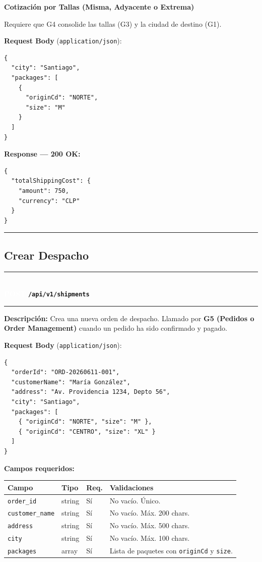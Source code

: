 \documentclass[11pt, a4paper]{article}
\newcommand{\httpmethod}[2]{%
  \colorbox{#1}{\textcolor{white}{\textbf{\small\textsf{#2}}}}%
}
\newcommand{\routeheader}[3]{%
  \noindent\rule{\textwidth}{1.5pt}\\[0.3em]
  \httpmethod{#1}{#2}\;\texttt{\bfseries #3}\\[0.3em]
  \rule{\textwidth}{0.4pt}
  \vspace{0.3cm}
}
\begin{document}
\vspace{0.3cm}
\textbf{Cotización por Tallas (Misma, Adyacente o Extrema)}

Requiere que G4 consolide las tallas (G3) y la ciudad de destino (G1).

\textbf{Request Body} (\texttt{application/json}):
\begin{lstlisting}
{
  "city": "Santiago",
  "packages": [
    {
      "originCd": "NORTE",
      "size": "M"
    }
  ]
}
\end{lstlisting}

\vspace{0.3cm}
\textbf{Response --- 200 OK:}

\begin{lstlisting}
{
  "totalShippingCost": {
    "amount": 750,
    "currency": "CLP"
  }
}
\end{lstlisting}

\noindent\rule{\textwidth}{0.4pt}

\subsection{Crear Despacho}

\routeheader{post}{POST}{/api/v1/shipments}

\textbf{Descripción:} Crea una nueva orden de despacho. Llamado por
\textbf{G5 (Pedidos o Order Management)} cuando un pedido ha sido confirmado y pagado.

\vspace{0.3cm}
\textbf{Request Body} (\texttt{application/json}):

\begin{lstlisting}
{
  "orderId": "ORD-20260611-001",
  "customerName": "María González",
  "address": "Av. Providencia 1234, Depto 56",
  "city": "Santiago",
  "packages": [
    { "originCd": "NORTE", "size": "M" },
    { "originCd": "CENTRO", "size": "XL" }
  ]
}
\end{lstlisting}

\textbf{Campos requeridos:}
\begin{table}[ht!]
\small
\begin{tabularx}{\textwidth}{l l l X}
  \toprule
  \textbf{Campo} & \textbf{Tipo} & \textbf{Req.} & \textbf{Validaciones} \\
  \midrule
  \texttt{order\_id}      & string & Sí & No vacío. Único. \\
  \texttt{customer\_name} & string & Sí & No vacío. Máx. 200 chars. \\
  \texttt{address}        & string & Sí & No vacío. Máx. 500 chars. \\
  \texttt{city}           & string & Sí & No vacío. Máx. 100 chars. \\
  \texttt{packages}       & array  & Sí & Lista de paquetes con \texttt{originCd} y \texttt{size}. \\
  \bottomrule
\end{tabularx}
\end{table}
\end{document}
